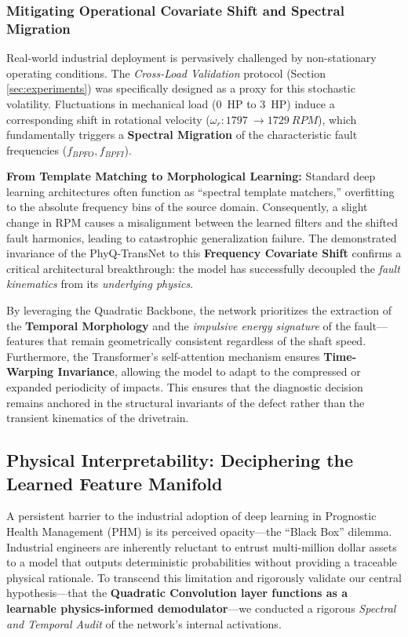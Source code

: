 \documentclass[5p,times,twocolumn]{elsarticle}
\begin{document}
\subsubsection{Mitigating Operational Covariate Shift and Spectral Migration}
Real-world industrial deployment is pervasively challenged by non-stationary operating conditions. The \textit{Cross-Load Validation} protocol (Section \ref{sec:experiments}) was specifically designed as a proxy for this stochastic volatility. Fluctuations in mechanical load (\SI{0}{HP} to \SI{3}{HP}) induce a corresponding shift in rotational velocity ($\omega_r: \SI{1797}{} \to \SI{1729}{RPM}$), which fundamentally triggers a \textbf{Spectral Migration} of the characteristic fault frequencies ($f_{BPFO}, f_{BPFI}$). 

\textbf{From Template Matching to Morphological Learning:}
Standard deep learning architectures often function as ``spectral template matchers,'' overfitting to the absolute frequency bins of the source domain. Consequently, a slight change in RPM causes a misalignment between the learned filters and the shifted fault harmonics, leading to catastrophic generalization failure. 
The demonstrated invariance of the PhyQ-TransNet to this \textbf{Frequency Covariate Shift} confirms a critical architectural breakthrough: the model has successfully decoupled the \textit{fault kinematics} from its \textit{underlying physics}. 



By leveraging the Quadratic Backbone, the network prioritizes the extraction of the \textbf{Temporal Morphology} and the \textit{impulsive energy signature} of the fault---features that remain geometrically consistent regardless of the shaft speed. Furthermore, the Transformer's self-attention mechanism ensures \textbf{Time-Warping Invariance}, allowing the model to adapt to the compressed or expanded periodicity of impacts. This ensures that the diagnostic decision remains anchored in the structural invariants of the defect rather than the transient kinematics of the drivetrain.

\subsection{Physical Interpretability: Deciphering the Learned Feature Manifold}
A persistent barrier to the industrial adoption of deep learning in Prognostic Health Management (PHM) is its perceived opacity---the ``Black Box'' dilemma. Industrial engineers are inherently reluctant to entrust multi-million dollar assets to a model that outputs deterministic probabilities without providing a traceable physical rationale. To transcend this limitation and rigorously validate our central hypothesis---that the \textbf{Quadratic Convolution layer functions as a learnable physics-informed demodulator}---we conducted a rigorous \textit{Spectral and Temporal Audit} of the network's internal activations.
\end{document}
